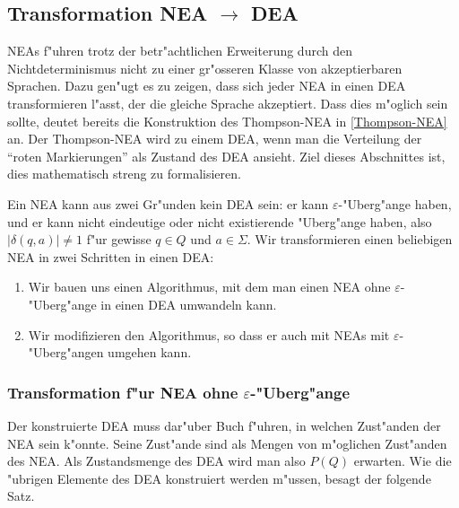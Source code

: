 \subsection{Transformation NEA \texorpdfstring{$\rightarrow$}{->} DEA\label{regulaer:nea-dea}}
NEAs f"uhren trotz der betr"achtlichen Erweiterung durch den
Nichtdeterminismus nicht zu einer gr"osseren Klasse von akzeptierbaren
Sprachen. Dazu gen"ugt es zu zeigen, dass sich jeder NEA in einen DEA
transformieren l"asst, der die gleiche Sprache akzeptiert.
Dass dies m"oglich sein sollte, deutet bereits die Konstruktion
des Thompson-NEA in \ref{Thompson-NEA} an. Der Thompson-NEA
wird zu einem DEA, wenn man die Verteilung der ``roten Markierungen''
als Zustand des DEA ansieht. Ziel dieses Abschnittes ist, dies
mathematisch streng zu formalisieren.

Ein NEA kann aus zwei Gr"unden kein DEA sein:
er kann $\varepsilon$-"Uberg"ange haben, und er kann nicht eindeutige
oder nicht existierende "Uberg"ange haben, also $|\delta(q,a)|\ne 1$
f"ur gewisse $q\in Q$ und $a\in\Sigma$.  Wir transformieren einen 
beliebigen NEA in zwei Schritten in einen DEA:
\begin{enumerate}
\item Wir bauen uns einen Algorithmus, mit dem man einen NEA ohne
$\varepsilon$-"Uberg"ange in einen DEA umwandeln kann.
\item Wir modifizieren den Algorithmus, so dass er auch mit NEAs mit
$\varepsilon$-"Uberg"angen umgehen kann.
\end{enumerate}

\subsubsection{Transformation f"ur NEA ohne $\varepsilon$-"Uberg"ange}
Der konstruierte DEA muss dar"uber Buch f"uhren, in welchen Zust"anden
der NEA sein k"onnte. Seine Zust"ande sind als Mengen von m"oglichen
Zust"anden des NEA. Als Zustandsmenge des DEA wird man also $P(Q)$ 
erwarten. Wie die "ubrigen Elemente des DEA konstruiert werden m"ussen,
besagt der folgende Satz.

